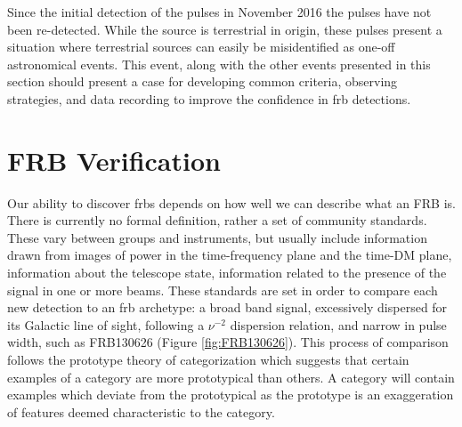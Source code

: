 \documentclass[a4paper,fleqn,usenatbib]{mnras}
\begin{document}
Since the initial detection of the pulses in November 2016 the pulses have not
been re-detected. While the source is terrestrial in origin, these pulses present a
situation where terrestrial sources can easily be misidentified as one-off
astronomical events. This event, along with the other events presented in this
section should present a case for developing common criteria, observing
strategies, and data recording to improve the confidence in \gls{frb}
detections.

\section{FRB Verification}
\label{sec:verify_crit}

Our ability to discover \glspl{frb} depends on how well we can describe what an
FRB is. There is currently no formal definition, rather a set of community
standards. These vary between groups and instruments, but usually include
information drawn from images of power in the time-frequency plane and the
time-DM plane, information about the telescope state, information related to the
presence of the signal in one or more beams.  These standards are set in order
to compare each new detection to an \gls{frb} archetype: a broad band signal,
excessively dispersed for its Galactic line of sight, following a $\nu^{-2}$
dispersion relation, and narrow in pulse width, such as FRB130626
\citep{2016MNRAS.460L..30C} (Figure \ref{fig:FRB130626}). This process of
comparison follows the prototype theory of categorization \citep{ROSCH1976382}
which suggests that certain examples of a category are more prototypical than
others. A category will contain examples which deviate from the prototypical as
the prototype is an exaggeration of features deemed characteristic to the
category.
\end{document}
